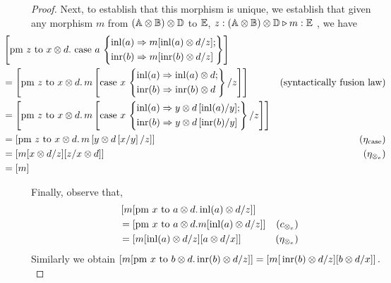 \begin{proof}
Next, to establish that this morphism is unique, we establish that given any morphism $m$ from $(\mathbb{A} \otimes \mathbb{B}) \otimes \mathbb{D} $ to $\mathbb{E}$, $z: (\mathbb{A} \otimes \mathbb{B}) \otimes \mathbb{D} \triangleright m : \mathbb{E} $ , we have
  \begin{align*}
   & \hspace{-30pt} \left[\text{pm } z \text{ to } x \otimes d. \text{ case } a\, \left\{ \begin{aligned}
      & \inl(a) \Rightarrow m[\inl(a) \otimes d/z];\\
      & \inr(b) \Rightarrow m [\inr(b) \otimes d/z]
    \end{aligned}
      \right\}
      \right] \\
    & \hspace{-30pt} =   \left[ \text{pm } z \text{ to } x \otimes d. \, m \left[\text{case } x\, \left\{ \begin{aligned}
      & \inl(a) \Rightarrow \inl(a) \otimes d;\\
      & \inr(b) \Rightarrow \inr(b) \otimes d
    \end{aligned}  \right\}/z \right] \right]& (\text{syntactically fusion law}) \\
    & \hspace{-30pt} = \left[ \text{pm } z \text{ to } x \otimes d. \, m \left[\text{case } x\, \left\{ \begin{aligned}
      & \inl(a) \Rightarrow y \otimes d \, [\inl(a)/y];\\
      & \inr(b) \Rightarrow  y \otimes d \, [\inr(b)/y]
    \end{aligned}  \right\}/z \right] \right] &  \\
    & \hspace{-30pt} =  \left[\text{pm } z \text{ to } x \otimes d. \, m \left[ y \otimes d \, [x/y] \,/z \right]  \right]& (\eta_{\text{case}})  \\ 
    & \hspace{-30pt} = \left[ m[x \otimes d/z][z/x\otimes d]\right]  & (\eta_{\otimes_e}) \\
    & \hspace{-30pt} = [m]
  \end{align*}

  Finally, observe that,
  \begin{align*}
    & \left[m [\text{pm } x \text{ to } a\otimes d. \, \mathrm{inl}(a) \otimes d/ z]  \right] \\
    & =  \left[ \text{pm }x \text{ to } a\otimes d. m[\mathrm{inl}(a) \otimes d/ z] \right] & (c_{\otimes_e})\\
    & =  \left[ m[\mathrm{inl}(a) \otimes d/ z] [a \otimes d/ x] \right] & (\eta_{\otimes_e})
  \end{align*}
  Similarly we obtain $\left[m [\text{pm } x \text{ to } b\otimes d. \, \mathrm{inr}(b) \otimes d/ z]  \right] = \left[m [ \, \mathrm{inr}(b) \otimes d/ z] [b \otimes d/ x]  \right]. $

 

 \end{proof}

